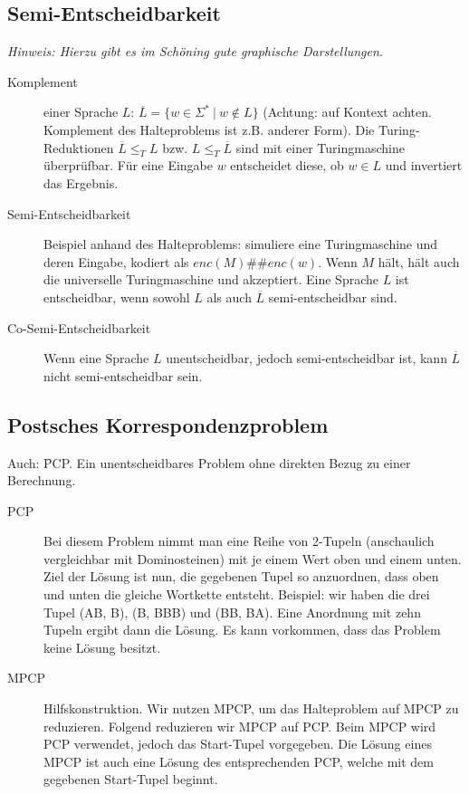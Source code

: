 \subsection{Semi-Entscheidbarkeit}
    \textit{Hinweis: Hierzu gibt es im Schöning gute graphische Darstellungen}. 
    \begin{description}
        \item[Komplement] einer Sprache $L$: $\overline{L} = \{w \in \Sigma^* ~|~ w \notin L \}$ (Achtung: auf Kontext achten. Komplement des Halteproblems ist z.B. anderer Form). Die Turing-Reduktionen $\overline{L} \leq_T L$ bzw. $L \leq_T \overline{L}$ sind mit einer Turingmaschine überprüfbar. Für eine Eingabe $w$ entscheidet diese, ob $w \in L$ und invertiert das Ergebnis.
        \item[Semi-Entscheidbarkeit] Beispiel anhand des Halteproblems: simuliere eine Turingmaschine und deren Eingabe, kodiert als $enc(M)\#\#enc(w)$. Wenn $M$ hält, hält auch die universelle Turingmaschine und akzeptiert. Eine Sprache $L$ ist entscheidbar, wenn sowohl $L$ als auch $\overline{L}$ semi-entscheidbar sind.
        \item[Co-Semi-Entscheidbarkeit] Wenn eine Sprache $L$ unentscheidbar, jedoch semi-entscheidbar ist, kann $\overline{L}$ nicht semi-entscheidbar sein.
    \end{description}


\newpage
\subsection{Postsches Korrespondenzproblem}
    Auch: \f{PCP}. Ein unentscheidbares Problem ohne direkten Bezug zu einer Berechnung. 
    \begin{description}
        \item[PCP] Bei diesem Problem nimmt man eine Reihe von 2-Tupeln (anschaulich vergleichbar mit Dominosteinen) mit je einem Wert oben und einem unten. Ziel der Lösung ist nun, die gegebenen Tupel so anzuordnen, dass oben und unten die gleiche Wortkette entsteht. Beispiel: wir haben die drei Tupel (AB, B), (B, BBB) und (BB, BA). Eine Anordnung mit zehn Tupeln ergibt dann die Lösung. Es kann vorkommen, dass das Problem keine Lösung besitzt.
        \item[MPCP] Hilfskonstruktion. Wir nutzen MPCP, um das Halteproblem auf MPCP zu reduzieren. Folgend reduzieren wir MPCP auf PCP. Beim MPCP wird PCP verwendet, jedoch das Start-Tupel vorgegeben. Die Lösung eines MPCP ist auch eine Lösung des entsprechenden PCP, welche mit dem gegebenen Start-Tupel beginnt.
    \end{description}


